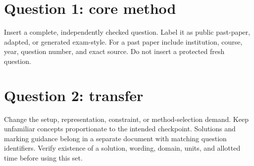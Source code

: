 \documentclass[11pt]{article}
\begin{document}
\section*{Question 1: core method}
Insert a complete, independently checked question. Label it as public past-paper, adapted, or generated exam-style. For a past paper include institution, course, year, question number, and exact source. Do not insert a protected fresh question.
\workarea{0.9in}
\section*{Question 2: transfer}
Change the setup, representation, constraint, or method-selection demand. Keep unfamiliar concepts proportionate to the intended checkpoint.
\workarea{0.9in}
\small Solutions and marking guidance belong in a separate document with matching question identifiers. Verify existence of a solution, wording, domain, units, and allotted time before using this set.
\end{document}
